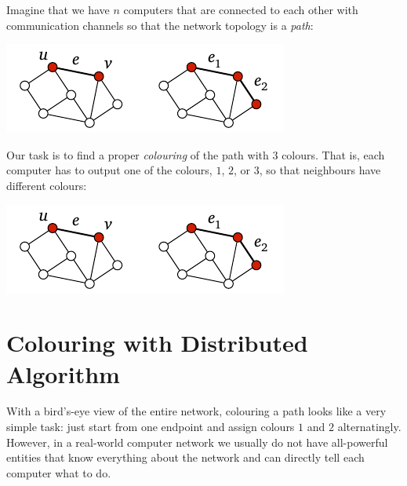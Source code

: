 
Imagine that we have $n$ computers that are connected to each other with communication channels so that the network topology is a \emph{path}:
\begin{center}
    \includegraphics[page=\PIntroTopo]{figs.pdf}
\end{center}
Our task is to find a proper \emph{colouring} of the path with $3$ colours. That is, each computer has to output one of the colours, $1$, $2$, or $3$, so that neighbours have different colours:
\begin{center}
    \includegraphics[page=\PIntroCol]{figs.pdf}
\end{center}

\section{Colouring with Distributed Algorithm}

With a bird's-eye view of the entire network, colouring a path looks like a very simple task: just start from one endpoint and assign colours $1$ and $2$ alternatingly. However, in a real-world computer network we usually do not have all-powerful entities that know everything about the network and can directly tell each computer what to do.

